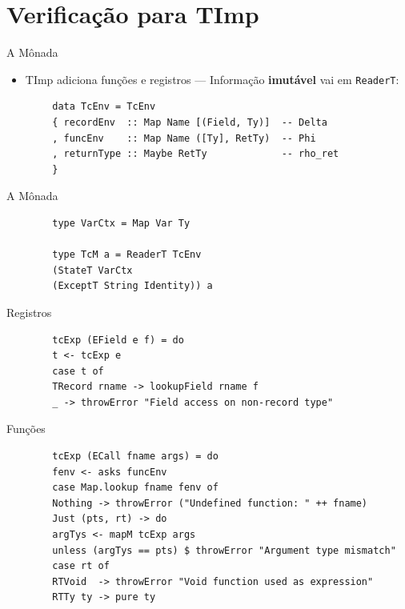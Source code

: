 \section{Verificação para TImp}\label{verificauxe7uxe3o-para-timp}

\begin{frame}[fragile]{A Mônada}

    \begin{itemize}

        \item
        TImp adiciona funções e registros --- Informação \textbf{imutável} vai
        em \texttt{ReaderT}:
    \end{itemize}

    \begin{lstlisting}
        data TcEnv = TcEnv
        { recordEnv  :: Map Name [(Field, Ty)]  -- Delta
        , funcEnv    :: Map Name ([Ty], RetTy)  -- Phi
        , returnType :: Maybe RetTy             -- rho_ret
        }
    \end{lstlisting}
\end{frame}

\begin{frame}[fragile]{A Mônada}

    \begin{lstlisting}
        type VarCtx = Map Var Ty

        type TcM a = ReaderT TcEnv
        (StateT VarCtx
        (ExceptT String Identity)) a
    \end{lstlisting}
\end{frame}

\begin{frame}[fragile]{Registros}

    \begin{lstlisting}
        tcExp (EField e f) = do
        t <- tcExp e
        case t of
        TRecord rname -> lookupField rname f
        _ -> throwError "Field access on non-record type"
    \end{lstlisting}
\end{frame}

\begin{frame}[fragile]{Funções}

    \begin{lstlisting}
        tcExp (ECall fname args) = do
        fenv <- asks funcEnv
        case Map.lookup fname fenv of
        Nothing -> throwError ("Undefined function: " ++ fname)
        Just (pts, rt) -> do
        argTys <- mapM tcExp args
        unless (argTys == pts) $ throwError "Argument type mismatch"
        case rt of
        RTVoid  -> throwError "Void function used as expression"
        RTTy ty -> pure ty
    \end{lstlisting}
\end{frame}

